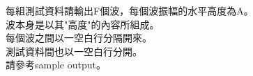 每組測試資料請輸出F個波，每個波振幅的水平高度為A。\\
波本身是以其"高度"的內容所組成。\\
每個波之間以一空白行分隔開來。\\
  測試資料間也以一空白行分開。\\
  請參考sample output。\\
